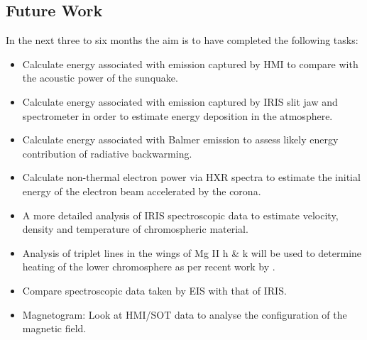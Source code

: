 \subsection{Future Work}
In the next three to six months the aim is to have completed the following tasks:
\begin{itemize}

\item Calculate energy associated with emission captured by HMI to compare with the acoustic power of the sunquake. 

\item Calculate energy associated with emission captured by IRIS slit jaw and spectrometer in order to estimate energy deposition in the atmosphere. 

\item Calculate energy associated with Balmer emission to assess likely energy contribution of radiative backwarming. 

\item Calculate non-thermal electron power via HXR spectra to estimate the initial energy of the electron beam accelerated by the corona. 

\item A more detailed analysis of IRIS spectroscopic data to estimate velocity, density and temperature of chromospheric material. 

\item Analysis of triplet lines in the wings of Mg II h \& k will be used to determine heating of the lower chromosphere as per recent work by \cite{2015arXiv150401733P}. 

\item Compare spectroscopic data taken by EIS with that of IRIS. 

\item Magnetogram: Look at HMI/SOT data to analyse the configuration of the magnetic field.

\end{itemize}
